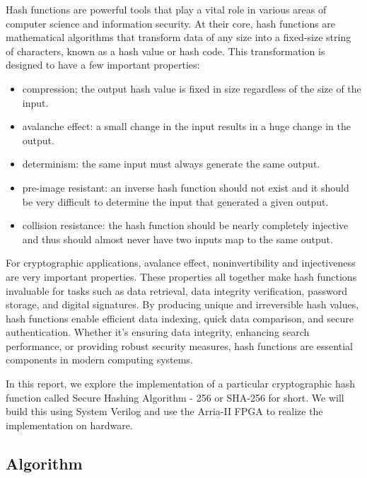 \documentclass{article}
\begin{document}
Hash functions are powerful tools that play a vital role in various areas of computer science and information security. At their core, hash functions are mathematical algorithms that transform data of any size into a fixed-size string of characters, known as a hash value or hash code. This transformation is designed to have a few important properties:
\begin{itemize} %
  \item compression; the output hash value is fixed in size regardless of the size of the input.
  \item avalanche effect: a small change in the input results in a huge change in the output.
  \item determinism: the same input must always generate the same output.
  \item pre-image resistant: an inverse hash function should not exist and it should be very difficult to determine the input that generated a given output.
  \item collision resistance: the hash function should be nearly completely injective and thus should almost never have two inputs map to the same output.
\end{itemize}
For cryptographic applications, avalance effect, noninvertibility and injectiveness are very important properties. These properties all together make hash functions invaluable for tasks such as data retrieval, data integrity verification, password storage, and digital signatures. By producing unique and irreversible hash values, hash functions enable efficient data indexing, quick data comparison, and secure authentication. Whether it's ensuring data integrity, enhancing search performance, or providing robust security measures, hash functions are essential components in modern computing systems.

In this report, we explore the implementation of a particular cryptographic hash function called Secure Hashing Algorithm - 256 or SHA-256 for short. We will build this using System Verilog and use the Arria-II FPGA to realize the implementation on hardware.

\subsection{Algorithm}
\end{document}
